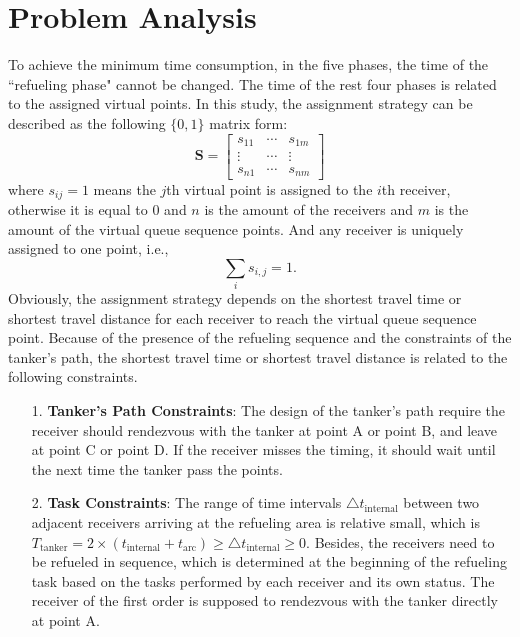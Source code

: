 \section{Problem Analysis}

To achieve the minimum time consumption, in the five phases, the time of the ``refueling phase" cannot be changed. The time of the rest four phases is related to the assigned virtual points. In this study, the assignment strategy can be described as the following $ \{ 0, 1 \} $ matrix form:
\begin{equation}
\textbf{S}=\left [ \begin{matrix}
s_{11} & \cdots  &  s_{1m}\\
\vdots  & \cdots  & \vdots\\
s_{n1} & \cdots &   s_{nm}
\end{matrix} \right ]  
\end{equation}
where $ s_{ij} =1$ means the $ j $th virtual point is assigned to the $ i $th receiver, otherwise it is equal to $ 0 $ and $ n $ is the amount of the receivers and $ m $ is the amount of the virtual queue sequence points. And any receiver is uniquely assigned to one point, i.e.,
\begin{equation}
\sum_{i} s_{i,j} =1.
\end{equation}
Obviously, the assignment strategy depends on the shortest travel time or shortest travel distance for each receiver to reach the virtual queue sequence point. Because of the presence of the refueling sequence and the constraints of the tanker's path, the shortest travel time or shortest travel distance is related to the following constraints. 
\begin{itemize}
	\item [ 1.] \textbf{Tanker's Path Constraints}:
	The design of the tanker's path require the receiver should rendezvous with the tanker at point A or point B, and leave at point C or point D. If the receiver misses the timing, it should wait until the next time the tanker pass the points.
	\item [ 2.] \textbf{Task Constraints}: 
	The range of time intervals $ \triangle {t}_{\text{internal}} $ between two adjacent receivers arriving at the refueling area is relative small, which is $ {T}_{\text{tanker}}=2 \times({t}_{\text{internal}}+{t_{\text{arc}}}) \ge \triangle {t}_{\text{internal}} \ge 0 $. Besides, the receivers need to be refueled in sequence, which is determined at the beginning of the refueling task based on the tasks performed by each receiver and its own status. The receiver of the first order is supposed to rendezvous with the tanker directly at point A.
	
\end{itemize}

